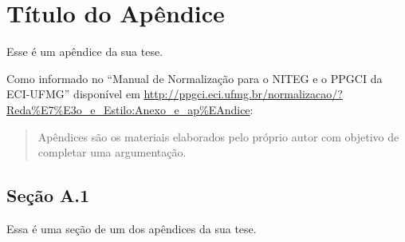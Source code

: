 \chapter{Título do Apêndice}
Esse é um apêndice da sua tese.

Como informado no ``Manual de Normalização para o NITEG e o PPGCI da ECI-UFMG''
disponível em
\url{http://ppgci.eci.ufmg.br/normalizacao/?Reda%E7%E3o_e_Estilo:Anexo_e_ap%EAndice}:
\begin{quote}
  Apêndices são os materiais elaborados pelo próprio autor com objetivo de
  completar uma argumentação. 
\end{quote}

\section{Seção A.1}
Essa é uma seção de um dos apêndices da sua tese.